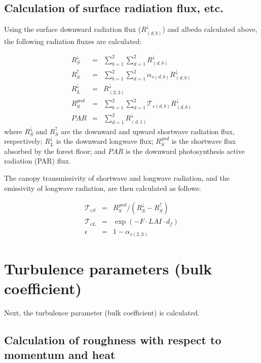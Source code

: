 \subsection{Calculation of surface radiation flux, etc.}\label{calculation-of-surface-radiation-flux-etc.}

Using the surface downward radiation flux (\(R^{\downarrow}_{(d,b)}\)) and albedo calculated above, the following radiation fluxes are calculated:

\begin{eqnarray}
 R^{\downarrow}_S &=& \sum_{b=1}^2\sum_{d=1}^2 R^{\downarrow}_{(d,b)} \\
 R^{\uparrow}_S &=& \sum_{b=1}^2\sum_{d=1}^2 \alpha_{s(d,b)} R^{\downarrow}_{(d,b)} \\
 R^{\downarrow}_L &=& R^{\downarrow}_{(2,3)} \\
 R^{gnd}_S &=& \sum_{b=1}^2\sum_{d=1}^2 {\mathcal{T}}_{s(d,b)} R^{\downarrow}_{(d,b)} \\
 PAR &=& \sum_{d=1}^2 R^{\downarrow}_{(d,1)}
\end{eqnarray} where \(R^{\downarrow}_S\) and \(R^{\uparrow}_S\) are the downward and upward shortwave radiation flux, respectively; \(R^{\downarrow}_L\) is the downward longwave flux; \(R^{gnd}_S\) is the
shortwave flux absorbed by the forest floor; and \(PAR\) is the downward photosynthesis active radiation (PAR) flux.

The canopy transmissivity of shortwave and longwave radiation, and the emissivity of longwave radiation, are then calculated as follows:

\begin{eqnarray}
 {\mathcal{T}}_{cS} &=& R^{gnd}_S / ( R^{\downarrow}_S - R^{\uparrow}_S ) \\
 {\mathcal{T}}_{cL} &=& \exp( - F \cdot LAI \cdot d_f ) \\
 \epsilon &=& 1 - \alpha_{s(2,3)}
\end{eqnarray}

\section{Turbulence parameters (bulk coefficient)}\label{turbulence-parameters-bulk-coefficient}

Next, the turbulence parameter (bulk coefficient) is calculated.

\subsection{Calculation of roughness with respect to momentum and heat}\label{calculation-of-roughness-with-respect-to-momentum-and-heat}

